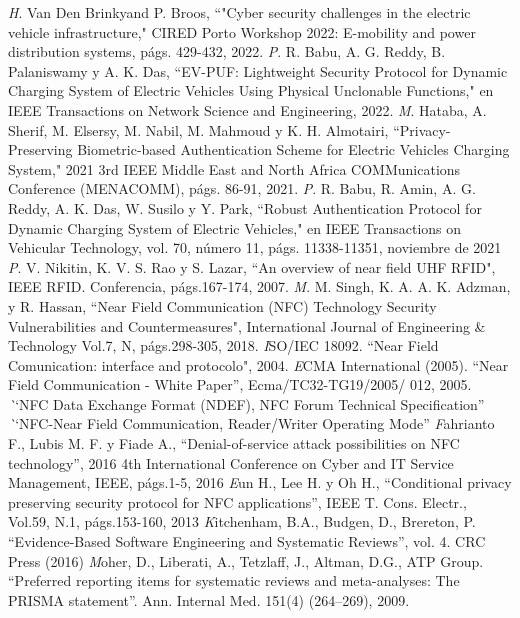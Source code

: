 \documentclass[12pt,a4paper,onecolumn,oneside]{report}
\begin{document}
\begin{thebibliography}{1}
 \textit H. Van Den Brinkyand P. Broos, ``"Cyber security challenges in the electric vehicle infrastructure," CIRED Porto Workshop 2022: E-mobility and power distribution systems, págs. 429-432, 2022.
 \textit P. R. Babu, A. G. Reddy, B. Palaniswamy y A. K. Das, ``EV-PUF: Lightweight Security Protocol for Dynamic Charging System of Electric Vehicles Using Physical Unclonable Functions," en IEEE Transactions on Network Science and Engineering, 2022.
 \textit M. Hataba, A. Sherif, M. Elsersy, M. Nabil, M. Mahmoud y K. H. Almotairi, ``Privacy-Preserving Biometric-based Authentication Scheme for Electric Vehicles Charging System," 2021 3rd IEEE Middle East and North Africa COMMunications Conference (MENACOMM), págs. 86-91, 2021.
 \textit P. R. Babu, R. Amin, A. G. Reddy, A. K. Das, W. Susilo y Y. Park, ``Robust Authentication Protocol for Dynamic Charging System of Electric Vehicles," en IEEE Transactions on Vehicular Technology, vol. 70, número 11, págs. 11338-11351, noviembre de 2021
 \textit P. V. Nikitin, K. V. S. Rao y S. Lazar, ``An overview of near field UHF RFID", IEEE RFID. Conferencia, p\'ags.167-174, 2007.
 \textit M. M. Singh, K. A. A. K. Adzman, y R. Hassan, ``Near Field Communication (NFC) Technology Security Vulnerabilities and Countermeasures", International Journal of Engineering \& Technology Vol.7, N, p\'ags.298-305, 2018.
 \textit ISO/IEC 18092. ``Near Field Comunication: interface and protocolo", 2004.
 \textit ECMA International (2005). ``Near Field Communication - White Paper”, Ecma/TC32-TG19/2005/ 012, 2005.
 \textit ``NFC Data Exchange Format (NDEF), NFC Forum Technical Specification”
 \textit ``NFC-Near Field Communication, Reader/Writer Operating Mode”
 \textit Fahrianto F., Lubis M. F. y Fiade A., ``Denial-of-service attack possibilities on NFC technology”, 2016 4th International Conference on Cyber and IT Service Management, IEEE, págs.1-5, 2016
 \textit Eun H., Lee H. y Oh H., ``Conditional privacy preserving security protocol for NFC applications”, IEEE T. Cons. Electr., Vol.59, N\textdegree.1, págs.153-160, 2013
 \textit Kitchenham, B.A., Budgen, D., Brereton, P. ``Evidence-Based Software Engineering and Systematic Reviews”, vol. 4. CRC Press (2016)
 \textit Moher, D., Liberati, A., Tetzlaff, J., Altman, D.G., ATP Group. ``Preferred reporting
items for systematic reviews and meta-analyses: The PRISMA statement”. Ann. Internal Med. 151(4) (264–269), 2009.

\end{thebibliography}
\end{document}
